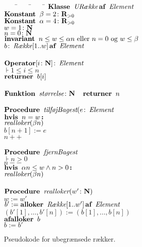 \begin{figure}
  \begin{tabbing}
    ~~~~\=~~~~\=~~~~\=\kill
    $\Class \varname{URække} \of \varname{Element}$\\
    \>$\Constant \beta = 2\colon \RR_{>0}$\\
    \>$\Constant \alpha = 4\colon \RR_{>0}$\\
    \>$w=1\colon\NN$\\
    \>$n=0\colon\NN$\\
    \>$\invariant n\leq w\leq \alpha n\text{ eller }n=0\text{ og }w\leq\beta$\\
    \>$b\colon\varname{Række} [1..w] \of \varname{Element}$\\
    \\
    \>$\mathbf{Operator} [i\colon\NN]\colon\varname{Element}$\\
    \>\>$\assert 1\leq i\leq n$\\
    \>\>$\return b[i]$\\
    \\
    \>$\Function \varname{størrelse}\colon\NN\quad\return n$\\
    \\
    \>$\Procedure\varname{tilføjBagest}(e\colon\varname{Element}$\\
    \>\>$\iif n=w\tthen$\\
    \>\>\>$\varname{realloker}(\beta n)$\\
    \>\>$b[n+1]:=e$\\
    \>\>$n++$\\
    \\
    \>$\Procedure\varname{fjernBagest}$\\
    \>\>$\assert n> 0$\\
    \>\>$n--$\\
    \>\>$\iif \alpha n\leq w\wedge n> 0\tthen$\\
    \>\>\>$\varname{realloker}(\beta n)$\\
    \\
    \>$\Procedure\varname{realloker}(w'\colon\NN)$\\
    \>\>$w:=w'$\\
    \>\>$b':= \allocate\varname{Række}[1..w']\of\varname{Element}$\\
    \>\>$(b'[1],\ldots,b'[n]):=(b[1],\ldots,b[n])$\\
    \>\>$\dispose b$\\
    \>\>$b:=b'$
  \end{tabbing}
  \caption{\label{fig: UArray pseudocode}%
  Pseudokode for ubegrænsede rækker.}
\end{figure}

